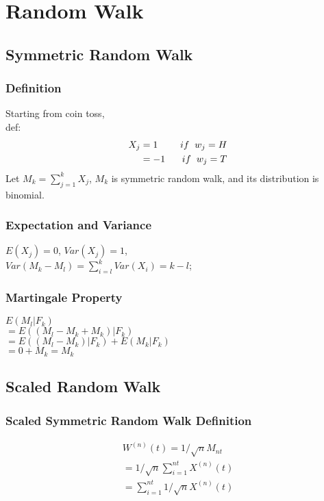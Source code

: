 \documentclass[a4paper]{article}
\begin{document}
\section{Random Walk}
\subsection{Symmetric Random Walk}
\subsubsection{Definition}
Starting from coin toss, \\
def:
\begin{align*}
X_j & =  1 \hspace{2mm} &if \hspace{2mm} w_j = H\\
    & = -1 \hspace{2mm} &if \hspace{2mm} w_j = T	
\end{align*}
Let $M_k = \sum_{j=1} ^{k} X_j$, $M_k$ is symmetric random walk, and its distribution is binomial.\\

\subsubsection{Expectation and Variance}
$E(X_j) =0$, $Var(X_j) =1$,\\
$Var(M_k - M_l) = \sum_{i=l}^{k} Var(X_i) = k - l$;\\

\subsubsection{Martingale Property} 
$E(M_l| F_k)$\\
$=E((M_l - M_k + M_k) | F_k)$\\
$=E((M_l - M_k) | F_k) + E(M_k | F_k)$\\
$=0 + M_k = M_k$\\

\subsection{Scaled Random Walk}
\subsubsection{Scaled Symmetric Random Walk Definition}
\begin{align*}
W^{(n)}(t) = 1/\sqrt{n} M_{nt}  \\
= 1/\sqrt{n} \sum_{i=1}^{nt} X^{(n)}(t)\\
= \sum_{i=1} ^{nt}  1/\sqrt{n} X^{(n)}(t) \\
\end{align*}
\end{document}

